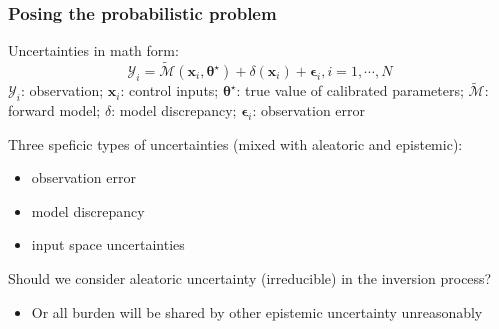 \begin{frame}
\frametitle{Posing the probabilistic problem}
\begin{block}{Uncertainties in math form:}
\begin{equation*}
\mathcal{Y}_i = \tilde{\mathcal{M}}(\boldsymbol{x}_i,\boldsymbol{\theta}^{\star}) 
+ \delta(\boldsymbol{x}_i)+
\boldsymbol{\epsilon}_{i}, i=1,\cdots,N
\end{equation*}
$\mathcal{Y}_i$: observation; $\boldsymbol{x}_i$: control inputs; $\boldsymbol{\theta}^{\star}$: true value of calibrated parameters; $\tilde{\mathcal{M}}$: forward model; $\delta$: model discrepancy; $\boldsymbol{\epsilon}_{i}$: observation error  
\end{block}

\begin{block}{Three speficic types of uncertainties (mixed with aleatoric and epistemic): }
\begin{itemize}
    \item observation error
    \item model discrepancy
    \item input space uncertainties
\end{itemize}    
\end{block}

\begin{alertblock}{Should we consider aleatoric uncertainty (irreducible) in the inversion process?}
\begin{itemize}
    \item Or all burden will be shared by other epistemic uncertainty \alert{unreasonably}
\end{itemize}
    
\end{alertblock}
 
\end{frame}







